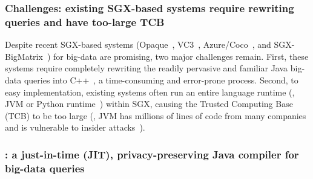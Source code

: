 \vspace{-.15in}
\subsubsection{Challenges: existing SGX-based systems require rewriting 
queries and have too-large TCB} 
\label{sec:ift-problem}\vspace{-.075in}

Despite recent SGX-based systems (Opaque~\cite{opaque:nsdi17}, 
VC3~\cite{vc3:sp15}, Azure/Coco~\cite{azure:coco}, and 
SGX-BigMatrix~\cite{bigmatrix:ccs17}) for big-data are promising, two major 
challenges remain. First, these systems require completely rewriting the 
readily pervasive and familiar Java big-data queries 
into C++~\cite{opaque:nsdi17,vc3:sp15,azure:coco}, a time-consuming and 
error-prone process. Second, to easy implementation, existing systems often 
run an entire language runtime (\eg, JVM or Python 
runtime~\cite{bigmatrix:ccs17}) within SGX, causing the Trusted Computing Base 
(TCB) to be too large (\eg, JVM has millions of lines of code 
from many companies and is vulnerable to insider attacks~\cite{top-threats}).

\vspace{-.15in}
\subsubsection{\maat: a just-in-time (JIT), privacy-preserving Java compiler 
for big-data queries} 
\label{sec:ift-problem}\vspace{-.075in}

